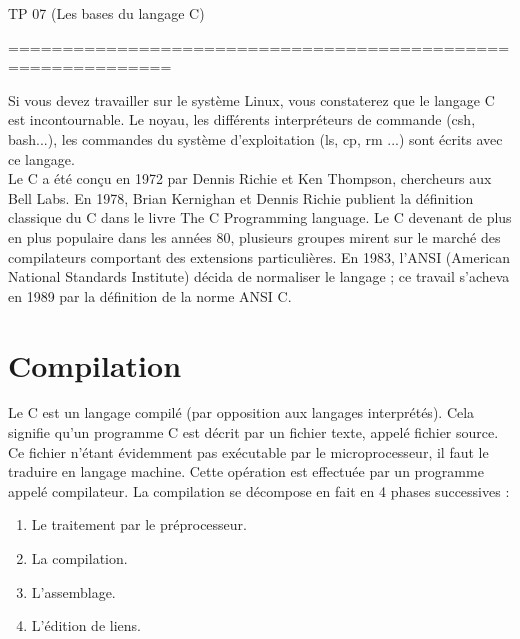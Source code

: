 \documentclass[10pt,a4paper]{article}
\begin{document}
\begin{center}
\huge{TP 07 (Les bases du langage C)}
\end{center}
=============================================================

Si vous devez travailler sur le système Linux, vous constaterez que le langage C est incontournable. Le noyau, les différents interpréteurs de commande (csh, bash...), les commandes du système d’exploitation (ls, cp, rm ...) sont écrits avec ce langage.\\
Le C a été conçu en 1972 par Dennis Richie et Ken Thompson, chercheurs aux Bell Labs. En 1978, Brian Kernighan et Dennis Richie publient la définition classique du C dans le livre The C Programming language. Le C devenant de plus en plus populaire dans les années 80, plusieurs groupes mirent sur le marché des compilateurs comportant des extensions particulières. En 1983, l'ANSI (American National Standards Institute) décida de normaliser le langage ; ce travail s'acheva en 1989 par la définition de la norme ANSI C.

\section {Compilation}

Le C est un langage compilé (par opposition aux langages interprétés). Cela signifie qu'un programme C est décrit par un fichier texte, appelé fichier source. Ce fichier n'étant évidemment pas exécutable par le microprocesseur, il faut le traduire en langage machine. Cette opération est effectuée par un programme appelé compilateur. La compilation se décompose en fait en 4 phases successives : 
\begin{enumerate}

\item Le traitement par le préprocesseur.
\item La compilation.
\item L'assemblage.
\item L'édition de liens.
\end{enumerate}
\end{document}
